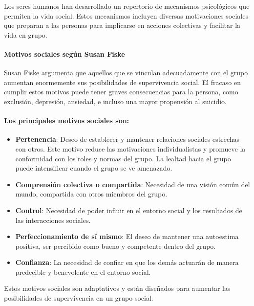 \documentclass[
]{website}
\providecommand{\tightlist}{%
  \setlength{\itemsep}{0pt}\setlength{\parskip}{0pt}}
\begin{document}
Los seres humanos han desarrollado un repertorio de mecanismos psicológicos que permiten la vida social. Estos mecanismos incluyen diversas motivaciones sociales que preparan a las personas para implicarse en acciones colectivas y facilitar la vida en grupo.

\paragraph*{Motivos sociales según Susan Fiske}\label{motivos-sociales-seguxfan-susan-fiske}

Susan Fiske argumenta que aquellos que se vinculan adecuadamente con el grupo aumentan enormemente sus posibilidades de supervivencia social. El fracaso en cumplir estos motivos puede tener graves consecuencias para la persona, como exclusión, depresión, ansiedad, e incluso una mayor propensión al suicidio.

\paragraph*{Los principales motivos sociales son:}\label{los-principales-motivos-sociales-son}

\begin{itemize}
\tightlist
\item
  \textbf{Pertenencia}: Deseo de establecer y mantener relaciones sociales estrechas con otros. Este motivo reduce las motivaciones individualistas y promueve la conformidad con los roles y normas del grupo. La lealtad hacia el grupo puede intensificar cuando el grupo se ve amenazado.
\item
  \textbf{Comprensión colectiva o compartida}: Necesidad de una visión común del mundo, compartida con otros miembros del grupo.
\item
  \textbf{Control}: Necesidad de poder influir en el entorno social y los resultados de las interacciones sociales.
\item
  \textbf{Perfeccionamiento de sí mismo}: El deseo de mantener una autoestima positiva, ser percibido como bueno y competente dentro del grupo.
\item
  \textbf{Confianza}: La necesidad de confiar en que los demás actuarán de manera predecible y benevolente en el entorno social.
\end{itemize}

Estos motivos sociales son adaptativos y están diseñados para aumentar las posibilidades de supervivencia en un grupo social.
\end{document}
